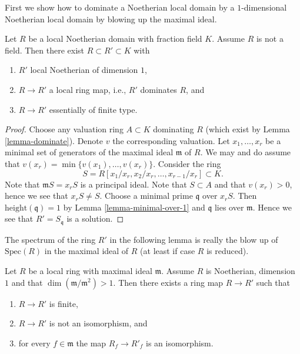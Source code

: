 \medskip\noindent
First we show how to dominate a Noetherian local domain
by a $1$-dimensional Noetherian local domain by blowing up
the maximal ideal.

\begin{lemma}
\label{lemma-dominate-by-dimension-1}
Let $R$ be a local Noetherian domain with fraction field $K$.
Assume $R$ is not a field.
Then there exist $R \subset R' \subset K$ with
\begin{enumerate}
\item $R'$ local Noetherian of dimension $1$,
\item $R \to R'$ a local ring map, i.e., $R'$ dominates $R$, and
\item $R \to R'$ essentially of finite type.
\end{enumerate}
\end{lemma}

\begin{proof}
Choose any valuation ring $A \subset K$ dominating $R$ (which
exist by Lemma \ref{lemma-dominate}).
Denote $v$ the corresponding valuation.
Let $x_1, \ldots, x_r$ be a minimal set of generators of the
maximal ideal $\mathfrak m$ of $R$. We may and do assume that
$v(x_r) = \min\{v(x_1), \ldots, v(x_r)\}$. Consider the ring
$$
S = R[x_1/x_r, x_2/x_r, \ldots, x_{r - 1}/x_r] \subset K.
$$
Note that $\mathfrak mS = x_rS$ is a principal ideal.
Note that $S \subset A$ and that $v(x_r) > 0$, hence we see
that $x_rS \not = S$. Choose a minimal prime $\mathfrak q$
over $x_rS$. Then $\text{height}(\mathfrak q) = 1$ by
Lemma \ref{lemma-minimal-over-1}
and $\mathfrak q$ lies over $\mathfrak m$. Hence we
see that $R' = S_{\mathfrak q}$ is a solution.
\end{proof}

\noindent
The spectrum of the ring $R'$ in the following lemma is really the
blow up of $\text{Spec}(R)$ in the maximal ideal of $R$ (at least if
case $R$ is reduced).

\begin{lemma}
\label{lemma-nonregular-dimension-one}
Let $R$ be a local ring with maximal ideal $\mathfrak m$.
Assume $R$ is Noetherian, dimension $1$ and that
$\dim(\mathfrak m/\mathfrak m^2) > 1$. Then there exists
a ring map $R \to R'$ such that
\begin{enumerate}
\item $R \to R'$ is finite,
\item $R \to R'$ is not an isomorphism, and
\item for every $f \in \mathfrak m$ the map $R_f \to R'_f$ is an
isomorphism.
\end{enumerate}
\end{lemma}

